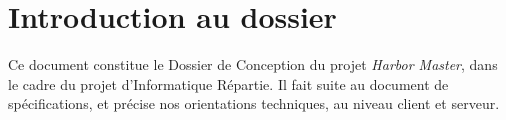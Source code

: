 \section{Introduction au dossier}
\label{sec:introductionAuDossier}
Ce document constitue le Dossier de Conception du projet \emph{Harbor Master}, dans le cadre du projet d'Informatique Répartie. Il fait suite au document de spécifications, et précise nos orientations techniques, au niveau client et serveur.
